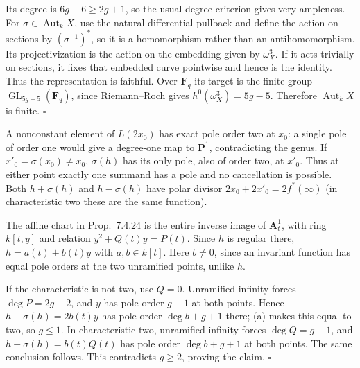\documentclass[11pt]{article}
\let\chapterexercise\exercise
\renewcommand{\exercise}[2]{\Needspace{8\baselineskip}\chapterexercise{#1}{#2}}
\begin{document}
\pf
Its degree is $6g-6\ge2g+1$, so the usual degree criterion gives very ampleness. For $\sigma\in\operatorname{Aut}_kX$, use the natural differential pullback and define the action on sections by $(\sigma^{-1})^*$, so it is a homomorphism rather than an antihomomorphism. Its projectivization is the action on the embedding given by $\omega_X^3$. If it acts trivially on sections, it fixes that embedded curve pointwise and hence is the identity. Thus the representation is faithful. Over $\mathbf F_q$ its target is the finite group $\operatorname{GL}_{5g-5}(\mathbf F_q)$, since Riemann--Roch gives $h^0(\omega_X^3)=5g-5$. Therefore $\operatorname{Aut}_kX$ is finite. \hfill$\square$

\pf
A nonconstant element of $L(2x_0)$ has exact pole order two at $x_0$: a single pole of order one would give a degree-one map to $\mathbf P^1$, contradicting the genus. If $x'_0=\sigma(x_0)\ne x_0$, $\sigma(h)$ has its only pole, also of order two, at $x'_0$. Thus at either point exactly one summand has a pole and no cancellation is possible. Both $h+\sigma(h)$ and $h-\sigma(h)$ have polar divisor $2x_0+2x'_0=2f^*(\infty)$ (in characteristic two these are the same function).

The affine chart in Prop.~7.4.24 is the entire inverse image of $\mathbf A^1_t$, with ring $k[t,y]$ and relation $y^2+Q(t)y=P(t)$. Since $h$ is regular there, $h=a(t)+b(t)y$ with $a,b\in k[t]$. Here $b\ne0$, since an invariant function has equal pole orders at the two unramified points, unlike $h$.

If the characteristic is not two, use $Q=0$. Unramified infinity forces $\deg P=2g+2$, and $y$ has pole order $g+1$ at both points. Hence $h-\sigma(h)=2b(t)y$ has pole order $\deg b+g+1$ there; (a) makes this equal to two, so $g\le1$. In characteristic two, unramified infinity forces $\deg Q=g+1$, and $h-\sigma(h)=b(t)Q(t)$ has pole order $\deg b+g+1$ at both points. The same conclusion follows. This contradicts $g\ge2$, proving the claim. \hfill$\square$
\end{document}
